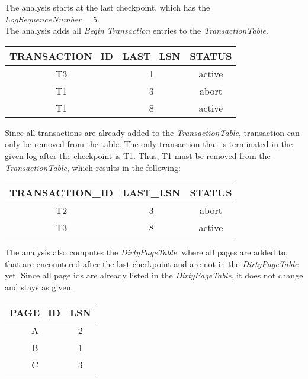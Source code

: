 \begin{exercise}{6}
  \begin{subexercise}
    The analysis starts at the last checkpoint, which has the $LogSequenceNumber=5$. \\
    The analysis adds all \emph{Begin Transaction} entries to the \emph{TransactionTable}.
    \\
    \begin{center}
      \begin{tabular}{ c | c | c }
        TRANSACTION\_ID & LAST\_LSN & STATUS\\ \hline
                      T3&         1 & active \\ \hline
                      T1&         3 & abort \\ \hline
                      T1&         8 & active \\
      \end{tabular}
    \end{center}
    Since all transactions are already added to the \emph{TransactionTable}, transaction can only be removed from the table. The only transaction that is terminated in the given log after the checkpoint is T1. Thus, T1 must be removed from the \emph{TransactionTable}, which results in the following:
    \\
    \begin{center}
      \begin{tabular}{ c | c | c }
        TRANSACTION\_ID & LAST\_LSN & STATUS\\ \hline
                      T2&         3 & abort \\ \hline
                      T3&         8 & active \\
      \end{tabular}
    \end{center}
    The analysis also computes the \emph{DirtyPageTable}, where all pages are added to, that are encountered after the last checkpoint and are not in the \emph{DirtyPageTable} yet. Since all page ids are already listed in the \emph{DirtyPageTable}, it does not change and stays as given.
    \\
    \begin{center}
      \begin{tabular}{ c | c }
        PAGE\_ID& LSN\\ \hline
              A &   2\\ \hline
              B &   1\\ \hline
              C &   3\\
      \end{tabular}
    \end{center}
  \end{subexercise}


\end{exercise}
